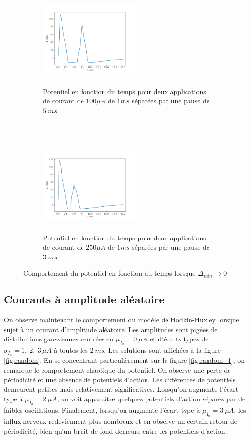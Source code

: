 \documentclass{article}
\begin{document}
\begin{figure}[H]
	\begin{subfigure}{0.5\linewidth}
		\includegraphics[width=5cm, height=5cm]{small_delta_100_5.pdf}
		\centering
		\caption{Potentiel en fonction du temps pour deux applications de courant de $100 \mu A$ de $1ms$ séparées par une pause de $5\ ms$}
		\label{fig:delta_100_5}
	\end{subfigure}
	~
	\begin{subfigure}{0.5\linewidth}
		\includegraphics[width=5cm, height=5cm]{small_delta_250_3.pdf}
		\centering
		\caption{Potentiel en fonction du temps pour deux applications de courant de $250 \mu A$ de $1ms$ séparées par une pause de $3\ ms$}
		\label{fig:delta_250_3}
	\end{subfigure}
	\caption{Comportement du potentiel en fonction du temps lorsque $\Delta_{min} \rightarrow 0$}
	\label{fig:small_delta}
\end{figure}



\subsection{Courants à amplitude aléatoire}\label{sec:courant_aleatoire}

On observe maintenant le comportement du modèle de Hodkin-Huxley lorsque sujet à un courant d'amplitude aléatoire. Les amplitudes sont pigées de distributions gaussiennes centrées en $\mu_{I_a}=0\ \mu A$  et d'écarts types de $\sigma_{I_a}= 1,\ 2,\ 3\ \mu A$ à toutes les $2\ ms$. Les solutions sont affichées à la figure \ref{fig:random}. En se concentrant particulièrement sur la figure \ref{fig:random_1}, on remarque le comportement chaotique du potentiel. On observe une perte de périodicité et une absence de potentiels d'action. Les différences de potentiels demeurent petites mais relativement significatives. Lorsqu'on augmente l'écart type à  $\mu_{I_a}=2\ \mu A$, on voit apparaître quelques potentiels d'action séparés par de faibles oscillations. Finalement, lorsqu'on augmente l'écart type à  $\mu_{I_a}=3\ \mu A$, les influx nerveux redeviennent plus nombreux et on observe un certain retour de périodicité, bien qu'un bruit de fond demeure entre les potentiels d'action.
\end{document}
